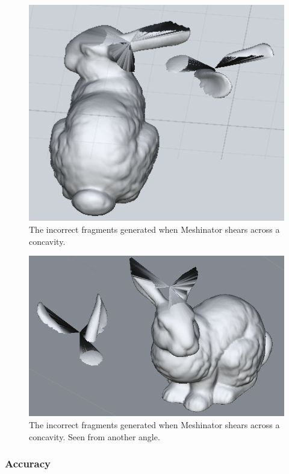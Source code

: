 \begin{figure}
\centerline{\includegraphics[scale=1]{fracture_non_concave.png}}
\caption{The incorrect fragments generated when Meshinator shears across a concavity.}
\label{fig:4.4}
\end{figure}
\begin{figure}
\centerline{\includegraphics[scale=0.75]{fracture_non_concave2.png}}
\caption{The incorrect fragments generated when Meshinator shears across a concavity. Seen from another angle.}
\label{fig:4.5}
\end{figure}

\clearpage
\subsubsection{Accuracy}

\label{sect:acc}

